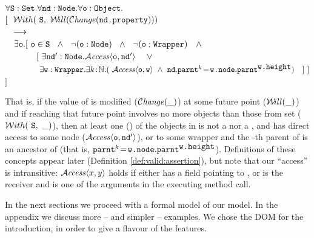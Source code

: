 \noindent
$\forall \prg{S}:\prg{Set}.\forall \prg{nd}:\prg{Node}.\forall \prg{o}:\prg{Object}.$\\
$[\ \ {\Using{\Future {\Changes {\prg{nd.property}}}}  {\prg{S}}}$ \\
$\strut  \ \ \longrightarrow$\\
$\strut \ \ \ \exists \prg{o}.[\ \prg{o}\in\prg{S}\ \ \wedge\ \ \neg(\prg{o}:\prg{Node})\ \ \wedge\  \ \neg(\prg{o}:\prg{Wrapper})\ \ \ \wedge \  $\\
$ \strut\ \ \  \ \ \ \ \ \ \ \ [\ \exists \prg{nd}':\prg{Node}. \CanAccess{\prg{o}}{\prg{nd}'}\  \ \ \  \vee$\\
$ \strut\ \  \ \  \ \  \ \ \ \ \ \ \ \exists \prg{w}:\prg{Wrapper}.\exists k\!:\!\mathbb{N}.
  (\ \CanAccess{\prg{o}}{\prg{w}}  \ \wedge\ \prg{nd}.\prg{parnt}^k\!=\!\prg{w.node}.\prg{parnt}^{\prg{w.height}}) \ \ \ ]\ ]$\\
$ ]$

\vspace{.1cm}

\noindent
That is, if  the value of  is modified ($\Changes{\_}$) at some future point ($\Future{\_}$) 
and if reaching that future point involves no more objects than those from
set  (\ie ${\Using{\_} {\prg{S}}}$), then at least one () of the objects in  is not a  nor a , and  has direct access to some  node ($\CanAccess{\prg{o}}{\prg{nd}'}$), or  to some wrapper  and the -th parent of  is an ancestor of  (that is, $\prg{parnt}^k\!=\!\prg{w.node}.\prg{parnt}^{\prg{w.height}}$).
Definitions of these concepts   appear later (Definition \ref{def:valid:assertion}), but  note that our ``access'' is intransitive: $\CanAccess x y$ holds if  either  has a field  pointing to , or    is the receiver and  is one of the arguments  in the executing method call.
 
In the next sections we proceed with a formal model of our model. In the appendix we discuss more -- and simpler -- examples.
We chose the DOM for the introduction, in order to give a flavour of the \Chainmail features.
 
